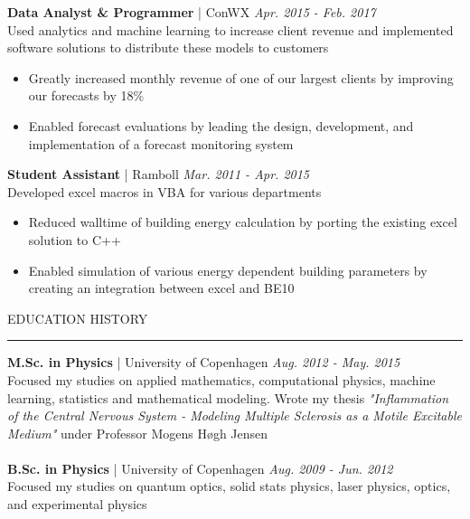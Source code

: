 \documentclass[12pt,a4paper]{article}
\newcommand{\textline}[3]{\normalsize{\textbf{#1} | #2 \hfill \textit{#3}}}
\newcommand{\headline}[1]{\Large \textcolor{myblue}{#1}}
\begin{document}
\vspace{0.5cm}
\textline{Data Analyst \& Programmer}{ConWX}{Apr. 2015 - Feb. 2017}\\
Used analytics and machine learning to increase client revenue and implemented software solutions to distribute these models to customers
\begin{itemize}[label=\textcolor{myblue}{\textbullet}]
    \vspace{-0.3cm}
    \item Greatly increased monthly revenue of one of our largest clients by improving our forecasts by 18\%
    \vspace{-0.3cm}
    \item Enabled forecast evaluations by leading the design, development, and implementation of a forecast monitoring system
    \vspace{-0.3cm}
\end{itemize}

\textline{Student Assistant}{Ramboll}{Mar. 2011 - Apr. 2015}\\
Developed excel macros in VBA for various departments
\begin{itemize}[label=\textcolor{myblue}{\textbullet}]
    \vspace{-0.3cm}
    \item Reduced walltime of building energy calculation by porting the existing excel solution to C++
    \vspace{-0.3cm}
    \item Enabled simulation of various energy dependent building parameters by creating an integration between excel and BE10
\end{itemize}

{\headline{EDUCATION HISTORY}}
\vspace{0.2cm}
{\color{myblue}\hrule height 0.3mm}
\vspace{0.2cm}
\textline{\normalsize{M.Sc. in Physics}}{University of Copenhagen}{\normalsize{Aug. 2012 - May. 2015}}\\
Focused my studies on applied mathematics, computational physics, machine learning, statistics and mathematical modeling. Wrote my thesis \textit{"Inflammation of the Central Nervous System - Modeling Multiple Sclerosis as a Motile Excitable Medium"} under Professor Mogens Høgh Jensen\\
\\
\textline{\normalsize{B.Sc. in Physics}}{University of Copenhagen}{\normalsize{Aug. 2009 - Jun. 2012}}\\
Focused my studies on quantum optics, solid stats physics, laser physics, optics, and experimental physics\\
\end{document}
